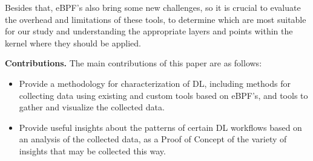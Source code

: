 \documentclass[conference]{IEEEtran}
\begin{document}
Besides that, eBPF's also bring some new challenges, so it is crucial to evaluate the overhead and limitations of these tools, to determine which are most suitable for our study and understanding the appropriate layers and points within the kernel where they should be applied.

\textbf{Contributions.} The main contributions of this paper are as follows:
\begin{itemize}
	\item Provide a methodology for characterization of DL, including methods for collecting data using existing and custom tools based on eBPF's, and tools to gather and visualize the collected data.
	\item Provide useful insights about the patterns of certain DL workflows based on an analysis of the collected data, as a Proof of Concept of the variety of insights that may be collected this way.
\end{itemize}

\end{document}

